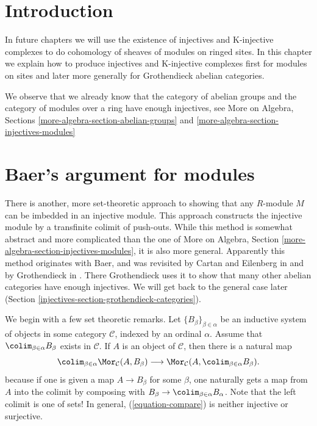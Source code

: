 \section{Introduction}
\label{injectives-section-introduction}
In future chapters we will use the existence of injectives and
K-injective complexes to do cohomology of sheaves of modules on
ringed sites. In this chapter we explain how to produce injectives
and K-injective complexes first for modules on sites and later
more generally for Grothendieck abelian categories.

\medskip\noindent
We observe that we already know that the category of
abelian groups and the category of modules over a ring have
enough injectives, see More on Algebra, Sections
\ref{more-algebra-section-abelian-groups} and
\ref{more-algebra-section-injectives-modules}

\section{Baer's argument for modules}
\label{injectives-section-baer}
There is another, more set-theoretic approach to showing that any $R$-module
$M$ can be imbedded in an injective module. This approach constructs
the injective module by a transfinite colimit of push-outs. While this
method is somewhat abstract and more complicated than the one of
More on Algebra, Section \ref{more-algebra-section-injectives-modules},
it is also more general. Apparently this method originates with Baer,
and was revisited by Cartan and Eilenberg in
\cite{Cartan-Eilenberg} and by Grothendieck in \cite{Tohoku}.
There Grothendieck uses it to show that
many other abelian categories have enough injectives. We will get back to
the general case later (Section \ref{injectives-section-grothendieck-categories}).

\medskip\noindent
We begin with a few set theoretic remarks.
Let $\{B_{\beta}\}_{\beta \in \alpha}$ be an inductive system of
objects in some category $\mathcal{C}$, indexed by
an ordinal $\alpha$. Assume that $\colim_{\beta \in \alpha} B_\beta$
exists in $\mathcal{C}$. If $A$ is an object of $\mathcal{C}$, then there is a
natural map
\begin{equation}
\label{equation-compare}
\colim_{\beta \in \alpha} \Mor_\mathcal{C}(A, B_\beta)
\longrightarrow
\Mor_\mathcal{C}(A, \colim_{\beta \in \alpha} B_\beta).
\end{equation}
because if one is given a map $A \to B_\beta$ for some $\beta$, one
naturally gets a map from $A$  into the colimit by composing with
$B_\beta \to \colim_{\beta \in \alpha} B_\alpha$.
Note that the left colimit is one of sets! In general, (\ref{equation-compare})
is neither injective or surjective.

